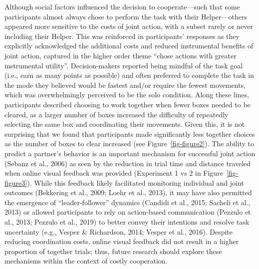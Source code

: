 \documentclass[
  11pt,
  letterpaper,
]{article}
\begin{document}
Although social factors influenced the decision to cooperate---such that
some participants almost always chose to perform the task with their
Helper---others appeared more sensitive to the costs of joint action,
with a subset rarely or never including their Helper. This was
reinforced in participants' responses as they explicitly acknowledged
the additional costs and reduced instrumental benefits of joint action,
captured in the higher order theme ``chose actions with greater
instrumental utility''. Decision-makers reported being mindful of the
task goal (i.e., earn as many points as possible) and often preferred to
complete the task in the mode they believed would be fastest and/or
require the fewest movements, which was overwhelmingly perceived to be
the solo condition. Along these lines, participants described choosing
to work together when fewer boxes needed to be cleared, as a larger
number of boxes increased the difficulty of repeatedly selecting the
same box and coordinating their movements. Given this, it is not
surprising that we found that participants made significantly less
together choices as the number of boxes to clear increased (see
Figure~\ref{fig-figure2}). The ability to predict a partner's behavior
is an important mechanism for successful joint action (Sebanz et al.,
2006) as seen by the reduction in trial time and distance traveled when
online visual feedback was provided (Experiment 1 vs 2 in
Figure~\ref{fig-figure3}). While this feedback likely facilitated
monitoring individual and joint outcomes (Bekkering et al., 2009; Loehr
et al., 2013), it may have also permitted the emergence of
``leader-follower'' dynamics (Candidi et al., 2015; Sacheli et al.,
2013) or allowed participants to rely on action-based communication
(Pezzulo et al., 2013; Pezzulo et al., 2019) to better convey their
intentions and resolve task uncertainty (e.g., Vesper \& Richardson,
2014; Vesper et al., 2016). Despite reducing coordination costs, online
visual feedback did not result in a higher proportion of together
trials; thus, future research should explore these mechanisms within the
context of costly cooperation.
\end{document}
